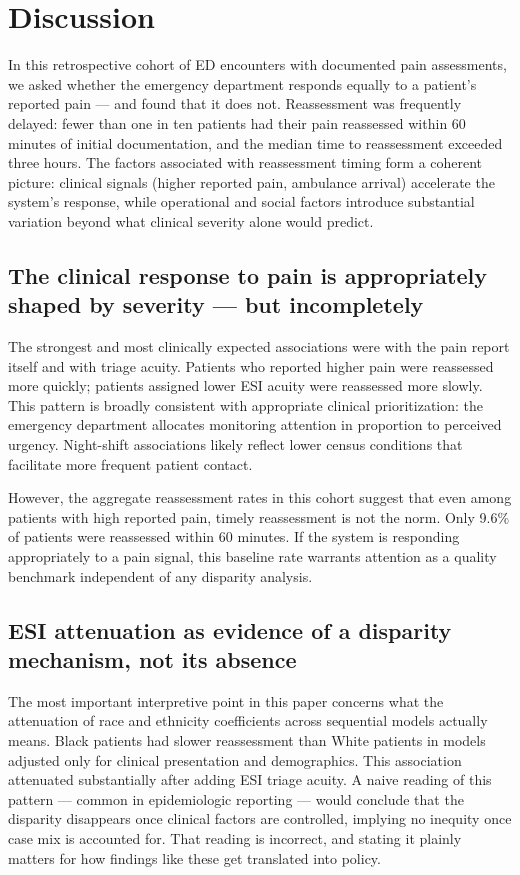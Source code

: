 \section{Discussion}
\label{sec:discussion}

In this retrospective cohort of ED encounters with documented pain assessments, we asked whether the emergency department responds equally to a patient's reported pain --- and found that it does not.
Reassessment was frequently delayed: fewer than one in ten patients had their pain reassessed within 60 minutes of initial documentation, and the median time to reassessment exceeded three hours.
The factors associated with reassessment timing form a coherent picture: clinical signals (higher reported pain, ambulance arrival) accelerate the system's response, while operational and social factors introduce substantial variation beyond what clinical severity alone would predict.

\subsection{The clinical response to pain is appropriately shaped by severity --- but incompletely}

The strongest and most clinically expected associations were with the pain report itself and with triage acuity.
Patients who reported higher pain were reassessed more quickly; patients assigned lower ESI acuity were reassessed more slowly.
This pattern is broadly consistent with appropriate clinical prioritization: the emergency department allocates monitoring attention in proportion to perceived urgency.
Night-shift associations likely reflect lower census conditions that facilitate more frequent patient contact.

However, the aggregate reassessment rates in this cohort suggest that even among patients with high reported pain, timely reassessment is not the norm.
Only 9.6\% of patients were reassessed within 60 minutes.
If the system is responding appropriately to a pain signal, this baseline rate warrants attention as a quality benchmark independent of any disparity analysis.

\subsection{ESI attenuation as evidence of a disparity mechanism, not its absence}

The most important interpretive point in this paper concerns what the attenuation of race and ethnicity coefficients across sequential models actually means.
Black patients had slower reassessment than White patients in models adjusted only for clinical presentation and demographics.
This association attenuated substantially after adding ESI triage acuity.
A naive reading of this pattern --- common in epidemiologic reporting --- would conclude that the disparity disappears once clinical factors are controlled, implying no inequity once case mix is accounted for.
That reading is incorrect, and stating it plainly matters for how findings like these get translated into policy.

